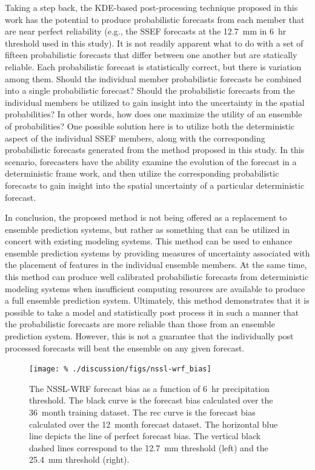 Taking a step back, the KDE-based post-processing technique proposed in this work has the potential to produce probabilistic forecasts from each member that are near perfect reliability (e.g., the SSEF forecasts at the \mbox{12.7 mm} in \mbox{6 hr} threshold used in this study).
It is not readily apparent what to do with a set of fifteen probabilistic forecasts that differ between one another but are statically reliable.
Each probabilistic forecast is statistically correct, but there is variation among them.
Should the individual member probabilistic forecasts be combined into a single probabilistic forecast?
Should the probabilistic forecasts from the individual members be utilized to gain insight into the uncertainty in the spatial probabilities?
In other words, how does one maximize the utility of an ensemble of probabilities?
One possible solution here is to utilize both the deterministic aspect of the individual SSEF members, along with the corresponding probabilistic forecasts generated from the method proposed in this study.
In this scenario, forecasters have the ability examine the evolution of the forecast in a deterministic frame work, and then utilize the corresponding probabilistic forecasts to gain insight into the spatial uncertainty of a particular deterministic forecast.


In conclusion, the proposed method is not being offered as a replacement to ensemble prediction systems, but rather as something that can be utilized in concert with existing modeling systems.
This method can be used to enhance ensemble prediction systems by providing measures of uncertainty associated with the placement of features in the individual ensemble members.
At the same time, this method can produce well calibrated probabilistic forecasts from deterministic modeling systems when insufficient computing resources are available to produce a full ensemble prediction system.
Ultimately, this method demonstrates that it is possible to take a model and statistically post process it in such a manner that the probabilistic forecasts are more reliable than those from an ensemble prediction system.
However, this is not a guarantee that the individually post processed forecasts will beat the ensemble on any given forecast.











\clearpage
\begin{figure}[cc]
    \centering
    \texttt{[image: \%
    ./discussion/figs/nssl-wrf\_bias]}\\
    \caption{The NSSL-WRF forecast bias as a function of \mbox{6 hr} precipitation threshold.
    The black curve is the forecast bias calculated over the \mbox{36 month} training dataset.
    The rec curve is the forecast bias calculated over the \mbox{12 month} forecast dataset.
    The horizontal blue line depicts the line of perfect forecast bias.
    The vertical black dashed lines correspond to the \mbox{12.7 mm} threshold (left) and the \mbox{25.4 mm} threshold (right).}
    \label{nssl-wrf_bias}
\end{figure}



